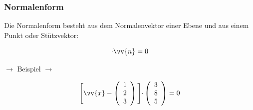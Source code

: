 \documentclass[a4paper, 15pt]{article}
\begin{document}
\subsubsection{Normalenform}
Die Normalenform besteht aus dem Normalenvektor einer Ebene und aus einem Punkt oder Stützvektor:\newline\newline
\begin{minipage}{.3\textwidth}
\begin{equation*}
[\vv{x}-\vv{p}]\cdot \vv{n} =0
\end{equation*}
\end{minipage}
\begin{minipage}{.3\textwidth}
\begin{center}
$\longrightarrow$ Beispiel $\longrightarrow$
\end{center}
\end{minipage}
\begin{minipage}{.3\textwidth}
\begin{equation*}
\Biggl[\vv{x}-\left(\begin{array}{c} 1 \\ 2 \\ 3 \end{array}\right)\Biggl]\cdot \left(\begin{array}{c} 3 \\ 8 \\ 5 \end{array}\right) = 0
\end{equation*}
\end{minipage}
\end{document}
